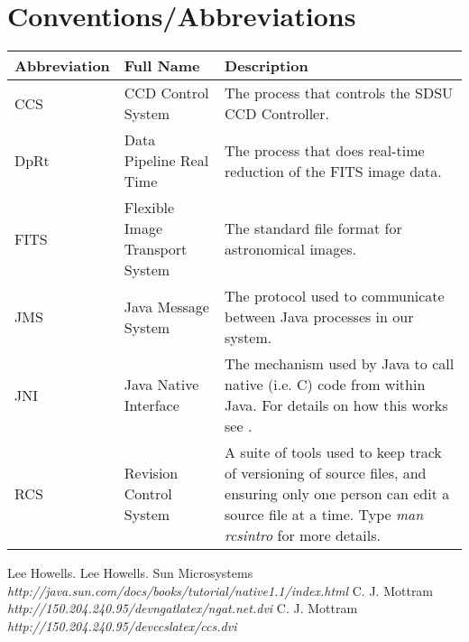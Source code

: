 \documentclass[10pt,a4paper]{article}
\begin{document}
\section{Conventions/Abbreviations}
\begin{center}
\begin{tabular}{|l|l|p{25em}|}
\hline
{\bf Abbreviation} & {\bf Full Name} & {\bf Description} \\
\hline
CCS  & CCD Control System      		& The process that controls the SDSU CCD Controller. \\
DpRt & Data Pipeline Real Time 		& The process that does real-time reduction of the FITS image data. \\
FITS & Flexible Image Transport System 	& The standard file format for astronomical images. \\
JMS  & Java Message System     		& The protocol used to communicate between Java processes in our system. \\
JNI  & Java Native Interface   		& The mechanism used by Java to call native (i.e. C) code from within Java. For
details on how this works see \cite{bib:jnitut}. \\
RCS  & Revision Control System		& A suite of tools used to keep track of versioning of source files, and
ensuring only one person can edit a source file at a time. Type {\em man rcsintro} for more details. \\
\hline
\end{tabular}
\end{center}

\begin{thebibliography}{99}
Lee Howells.
Lee Howells.
Sun Microsystems 
{\em http://java.sun.com/docs/books/tutorial/native1.1/index.html}
C. J. Mottram {\em http://150.204.240.95/devngatlatex/ngat.net.dvi}
C. J. Mottram {\em http://150.204.240.95/devccslatex/ccs.dvi}
\end{thebibliography}
\end{document}
